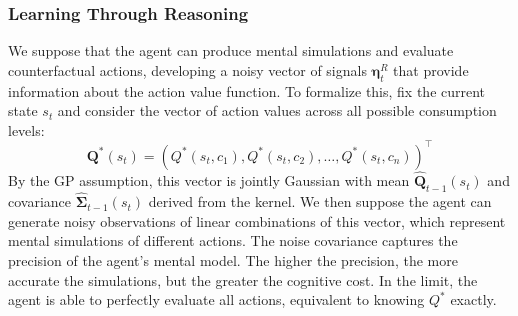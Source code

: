 \subsubsection{Learning Through Reasoning}

We suppose that the agent can produce mental simulations and evaluate counterfactual actions, developing a 
noisy vector of signals $\boldsymbol{\eta}^R_t$ that provide information about the 
action value function. To formalize this, fix the current state $s_t$ and consider 
the vector of action values across all possible consumption levels:
\begin{equation}
    \boldsymbol{Q}^*(s_t) = (Q^*(s_t, c_1), Q^*(s_t, c_2), \ldots, Q^*(s_t, c_n))^\top
\end{equation}
By the GP assumption, this vector is jointly Gaussian with mean 
$\hat{\boldsymbol{Q}}_{t-1}(s_t)$ and covariance $\hat{\boldsymbol{\Sigma}}_{t-1}(s_t)$ 
derived from the kernel. We then suppose the agent can generate noisy observations of
linear combinations of this vector, which represent mental simulations of different actions.
The noise covariance captures the precision of the agent's mental model. The higher the precision,
the more accurate the simulations, but the greater the cognitive cost. In the limit,
the agent is able to perfectly evaluate all actions, equivalent to knowing $Q^*$ exactly.

